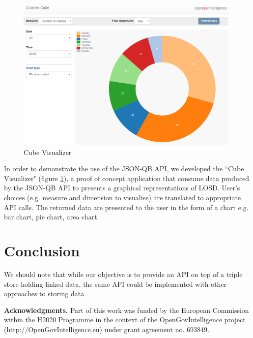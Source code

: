 \documentclass{llncs}
\begin{document}
\begin{figure}[h!]
  \includegraphics[width=110mm]{images/cubeVisualizer.png}
\caption{Cube Visualizer}
\label{fig:cubeVisualizer}
\end{figure}

In order to demonstrate the use of the JSON-QB API, we developed the ``Cube Visualizer" (figure \ref{fig:cubeVisualizer}), a proof of concept application that consume data produced by the JSON-QB API to presents a graphical representations of LOSD. User’s choices (e.g. measure and dimension to visualise) are translated to appropriate API calls. The returned data are presented to the user in the form of a chart e.g. bar chart, pie chart, area chart.


\section{Conclusion}\label{sec:conclusion}

We should note that while our objective is to provide an API on top of a triple store holding linked data, the same API could be implemented with other approaches to storing data






\vskip 0.5cm
\noindent \textbf{Acknowledgments.} Part of this work was funded by the European Commission
within the H2020 Programme in the context of the OpenGovIntelligence
project (http://OpenGovIntelligence.eu) under grant agreement no. 693849.




\end{document}
